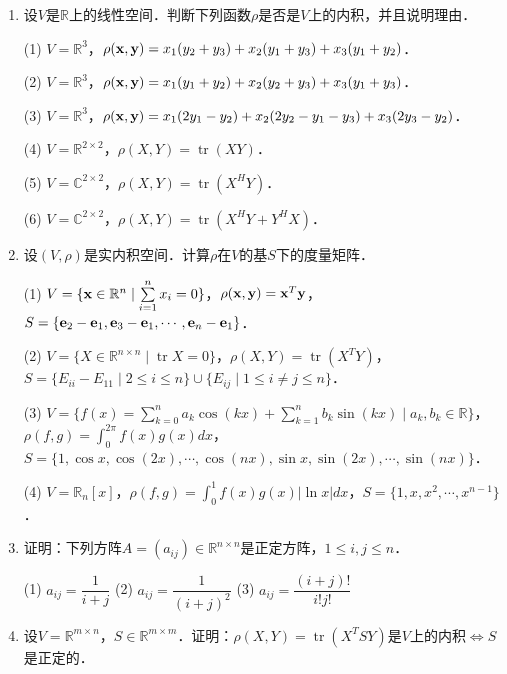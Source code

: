 \documentclass[a4paper,fontset=windows]{ctexbook}
\theoremstyle{definition}
\DeclareMathOperator{\tr}{tr}
\renewcommand{\le}{\leqslant}
\begin{document}
\begin{enumerate}
\item 设$V$是$\mathbb{R}$上的线性空间．判断下列函数$\rho$是否是$V$上的内积，并且说明理由．

(1) $V=\mathbb{R}^3$，$\rho({\bf x,y})=x_1(y_2+y_3)+x_2(y_1+y_3)+x_3(y_1+y_2)$．

(2) $V=\mathbb{R}^3$，$\rho({\bf x,y})=x_1(y_1+y_2)+x_2(y_2+y_3)+x_3(y_1+y_3)$．

(3) $V=\mathbb{R}^3$，$\rho({\bf x,y})=x_1(2y_1-y_2)+x_2(2y_2-y_1-y_3)+x_3(2y_3-y_2)$．

(4) $V=\mathbb{R}^{2\times 2}$，$\rho(X,Y)=\tr(XY)$．

(5) $V=\mathbb{C}^{2\times 2}$，$\rho(X,Y)=\tr(X^HY)$．

(6) $V=\mathbb{C}^{2\times 2}$，$\rho(X,Y)=\tr(X^HY+Y^HX)$．

\item 设$(V,\rho)$是实内积空间．计算$\rho$在$V$的基$S$下的度量矩阵．

(1) $V=\{{\bf x}\in\mathbb{R}^n\mid\sum\limits_{i=1}^nx_i=0\}$，$\rho({\bf x,y})={\bf x}^T{\bf y}$，$S=\{{\bf e}_2-{\bf e}_1,{\bf e}_3-{\bf e}_1,\cdots,{\bf e}_n-{\bf e}_1\}$．

(2) $V=\{X\in\mathbb{R}^{n\times n}\mid\tr X=0\}$，$\rho(X,Y)=\tr(X^TY)$，\\ \hspace*{18pt}$S=\{E_{ii}-E_{11}\mid 2\le i\le n\}\cup\{E_{ij}\mid 1\le i\ne j\le n\}$．

(3) $V=\{f(x)=\sum\limits_{k=0}^na_k\cos(kx)+\sum\limits_{k=1}^nb_k\sin(kx)\mid a_k,b_k\in\mathbb{R}\}$，$\rho(f,g)=\int_0^{2\pi}f(x)g(x)dx$，\\ \hspace*{18pt}$S=\{1,\cos x,\cos(2x),\cdots,\cos(nx),\sin x,\sin(2x),\cdots,\sin(nx)\}$．

(4) $V=\mathbb{R}_n[x]$，$\rho(f,g)=\int_0^1f(x)g(x)|\ln x|dx$，$S=\{1,x,x^2,\cdots,x^{n-1}\}$．

\item 证明：下列方阵$A=(a_{ij})\in\mathbb{R}^{n\times n}$是正定方阵，$1\le i,j\le n$．

(1) $a_{ij}=\dfrac{1}{i+j}$     \hspace{0.5in}
(2) $a_{ij}=\dfrac{1}{(i+j)^2}$ \hspace{0.5in}
(3) $a_{ij}=\dfrac{(i+j)!}{i!j!}$

\item 设$V=\mathbb{R}^{m\times n}$，$S\in\mathbb{R}^{m\times m}$．证明：$\rho(X,Y)=\tr(X^TSY)$是$V$上的内积$\Leftrightarrow S$是正定的．


\end{enumerate}
\end{document}
